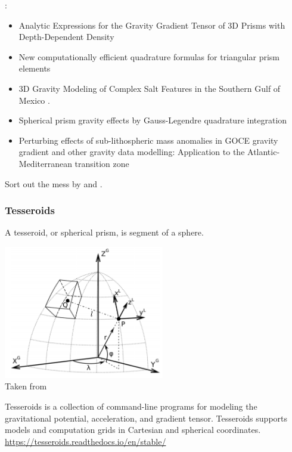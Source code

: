\Literature:
\begin{itemize}
\item Analytic Expressions for the Gravity Gradient Tensor 
      of 3D Prisms with Depth-Dependent Density \cite{jilz18}
\item New computationally efficient quadrature formulas for triangular prism elements \cite{kuym13}
\item 3D Gravity Modeling of Complex Salt Features in the Southern Gulf of Mexico \cite{naoo16}.
\item Spherical prism gravity effects by Gauss-Legendre quadrature integration \cite{asvk07}
\item Perturbing effects of sub-lithospheric mass anomalies in GOCE gravity gradient and other 
      gravity data modelling: Application to the Atlantic-Mediterranean transition zone \cite{furc15}
\end{itemize}

\bscthesis {} Sort out the mess by \cite{duti16} and \cite{zhhu17}.



\subsubsection{Tesseroids}

A tesseroid, or spherical prism, is segment of a sphere. 


\begin{center}
\includegraphics[width=7cm]{images/gravity/uibb11}\\
{\captionfont Taken from \cite{uibb11}}
\end{center}

Tesseroids is a collection of command-line programs for modeling the gravitational potential, 
acceleration, and gradient tensor. Tesseroids supports models and computation grids 
in Cartesian and spherical coordinates.
\url{https://tesseroids.readthedocs.io/en/stable/}

